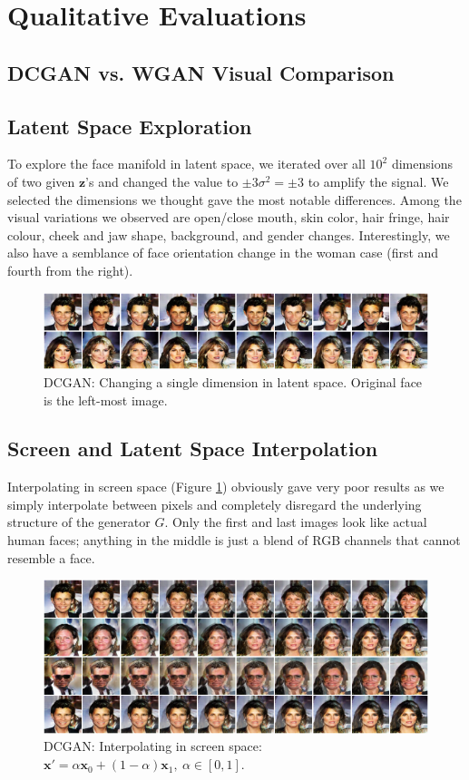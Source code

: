 \documentclass[table]{article}
\def\*#1{\mathbf{#1}}
\begin{document}
\newpage
\section{Qualitative Evaluations}
\subsection{DCGAN vs. WGAN Visual Comparison}


\subsection{Latent Space Exploration}
To explore the face manifold in latent space, we iterated over all $10^2$ dimensions of two given $\*z$'s and changed the value to $\pm 3\sigma^2 = \pm 3$ to amplify the signal. We selected the dimensions we thought gave the most notable differences. Among the visual variations we observed are open/close mouth, skin color, hair fringe, hair colour, cheek and jaw shape, background, and gender changes. Interestingly, we also have a semblance of face orientation change in the woman case (first and fourth from the right).
\begin{figure}[ht]
  \centering
  \includegraphics[width=\textwidth]{imgs/latent_explore}
  \caption{DCGAN: Changing a single dimension in latent space. Original face is the left-most image.}
\end{figure}

\subsection{Screen and Latent Space Interpolation}
Interpolating in screen space (Figure \ref{screen_lerp}) obviously gave very poor results as we simply interpolate between pixels and completely disregard the underlying structure of the generator $G$. Only the first and last images look like actual human faces; anything in the middle is just a blend of RGB channels that cannot resemble a face.

\begin{figure}[ht]
  \centering
  \includegraphics[width=\textwidth]{imgs/gan_screen_lerp}
  \caption{DCGAN: Interpolating in screen space: $\*x' = \alpha \*x_0 + (1-\alpha)\*x_1, \ \alpha \in [0,1]$.}
  \label{screen_lerp}
\end{figure}
\end{document}
